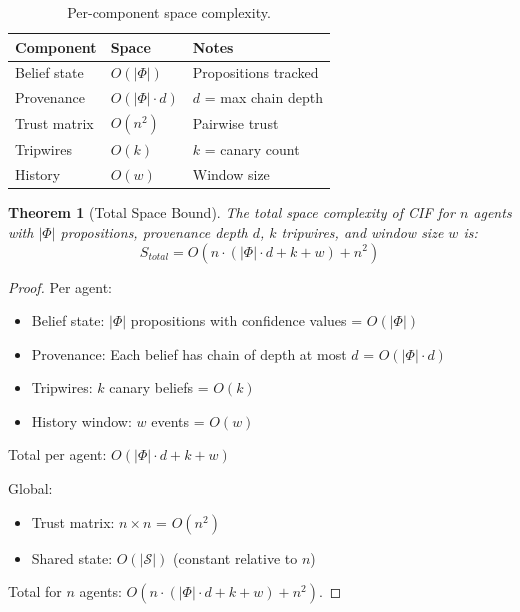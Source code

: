 \documentclass[
]{article}
\newtheorem{theorem}{Theorem}[section]
\begin{document}
\begin{table}[htbp]
\centering
\caption{Per-component space complexity.}
\label{tab:space-components}
\begin{tabular}{@{}lll@{}}
\toprule
Component & Space & Notes \\
\midrule
Belief state & $O(|\Phi|)$ & Propositions tracked \\
Provenance & $O(|\Phi| \cdot d)$ & $d$ = max chain depth \\
Trust matrix & $O(n^2)$ & Pairwise trust \\
Tripwires & $O(k)$ & $k$ = canary count \\
History & $O(w)$ & Window size \\
\bottomrule
\end{tabular}
\end{table}

\begin{theorem}[Total Space Bound]
\label{thm:space-bound}
The total space complexity of CIF for $n$ agents with $|\Phi|$ propositions, provenance depth $d$, $k$ tripwires, and window size $w$ is:
\begin{equation}
\label{eq:total-space}
S_{total} = O(n \cdot (|\Phi| \cdot d + k + w) + n^2)
\end{equation}
\end{theorem}

\begin{proof}
Per agent:
\begin{itemize}
\item Belief state: $|\Phi|$ propositions with confidence values = $O(|\Phi|)$
\item Provenance: Each belief has chain of depth at most $d$ = $O(|\Phi| \cdot d)$
\item Tripwires: $k$ canary beliefs = $O(k)$
\item History window: $w$ events = $O(w)$
\end{itemize}

Total per agent: $O(|\Phi| \cdot d + k + w)$

Global:
\begin{itemize}
\item Trust matrix: $n \times n$ = $O(n^2)$
\item Shared state: $O(|\mathcal{S}|)$ (constant relative to $n$)
\end{itemize}

Total for $n$ agents: $O(n \cdot (|\Phi| \cdot d + k + w) + n^2)$.
\end{proof}
\end{document}
